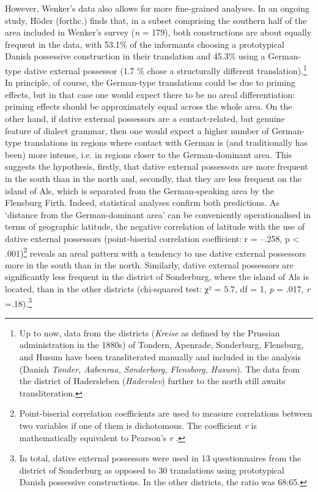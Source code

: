 \documentclass[output=paper]{langsci/langscibook}
\begin{document}
However, Wenker’s data also allows for more fine-grained analyses. In an ongoing study, Höder (forthc.) finds that, in a subset comprising the southern half of the area included in Wenker’s survey (\textit{n} = 179), both constructions are about equally frequent in the data, with 53.1\% of the informants choosing a prototypical Danish possessive construction in their translation and 45.3\% using a German-type dative external possessor (1.7 \% chose a structurally different translation).\footnote{Up to now, data from the districts (\textit{Kreise} as defined by the Prussian administration in the 1880s) of Tondern, Apenrade, Sonderburg, Flensburg, and Husum have been transliterated manually and included in the analysis (Danish \textit{Tønder,} \textit{Aabenraa,} \textit{Sønderborg,} \textit{Flensborg,} \textit{Husum}). The data from the district of Hadersleben (\textit{Haderslev}) further to the north still awaits transliteration.} In principle, of course, the German-type translations could be due to priming effects, but in that case one would expect there to be no areal differentiation: priming effects should be approximately equal across the whole area. On the other hand, if dative external possessors are a contact-related, but genuine feature of dialect grammar, then one would expect a higher number of German-type translations in regions where contact with German is (and traditionally has been) more intense, i.e. in regions closer to the German-dominant area. This suggests the hypothesis, firstly, that dative external possessors are more frequent in the south than in the north and, secondly, that they are less frequent on the island of Als, which is separated from the German-speaking area by the Flensburg Firth. Indeed, statistical analyses confirm both predictions. As ‘distance from the German-dominant area’ can be conveniently operationalised in terms of geographic latitude, the negative correlation of latitude with the use of dative external possessors (point-biserial correlation coefficient: r = –.258, p < .001)\footnote{Point-biserial correlation coefficients are used to measure correlations between two variables if one of them is dichotomous. The coefficient \textit{r} is mathematically equivalent to Pearson’s \textit{r} \citep{Kornbrot.2014}.} reveals an areal pattern with a tendency to use dative external possessors more in the south than in the north. Similarly, dative external possessors are significantly less frequent in the district of Sonderburg, where the island of Als is located, than in the other districts (chi-squared test: χ² = 5.7, df = 1, \textit{p} = .017, \textit{r} =.18).\footnote{In total, dative external possessors were used in 13 questionnaires from the district of Sonderburg as opposed to 30 translations using prototypical Danish possessive constructions. In the other districts, the ratio was 68:65.}
\end{document}

